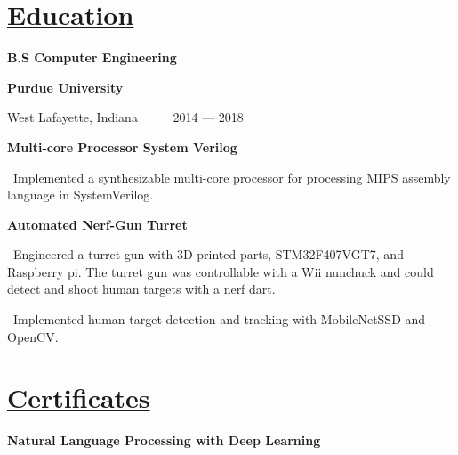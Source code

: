 \documentclass{article}
\begin{document}
\begin{minipage}[t][0pt]{8in\linewidth}
\begin{minipage}[t]{3.1in\linewidth\hspace{2.8em}}
    \vspace{1em}
    \section{\underline{Education}}
    \vspace{-0.75em}
    \large\bfseries{B.S Computer Engineering}

    \bfseries{Purdue University} 

    \small\mdseries\textrm West Lafayette, Indiana \, \, \, \, \, 2014 — 2018

    \vspace{0.4em}

    \small\bfseries\textrm{Multi-core Processor System Verilog}
    
    \vspace{0.3em}
    \small\mdseries
    \hspace{0em}\textasteriskcentered \, \frenchspacing\mdseries\textrm{Implemented a synthesizable multi-core processor for processing MIPS assembly language in SystemVerilog.}
    \vspace{0.8em}
    
    \small\bfseries\textrm{Automated Nerf-Gun Turret}
    
    \vspace{0.3em}
    \small\mdseries
    \hspace{0em}\textasteriskcentered \, \frenchspacing\mdseries\textrm Engineered a turret gun with 3D printed parts, STM32F407VGT7, and Raspberry pi. The turret gun was controllable with a Wii nunchuck and could detect and shoot human targets with a nerf dart.

    \vspace{0.5em}
    \small\mdseries
    \hspace{0em}\textasteriskcentered \, \frenchspacing\mdseries\textrm Implemented human-target detection and tracking with MobileNetSSD and OpenCV.

    \vspace{0.5em}     
    \section{\underline{Certificates}}
        \begin{minipage}[t]{3.3in\textwidth\hspace{0in}}    
            
            \vspace{-1.5em}        
            \mdseries\bfseries{Natural Language Processing with Deep Learning}
            

\end{minipage}
\end{minipage}
\end{minipage}
\end{document}
